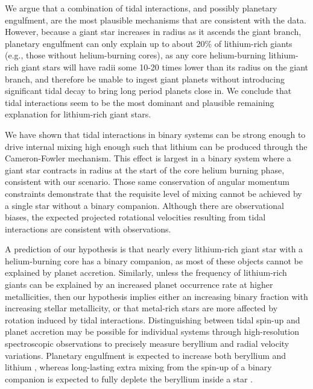 \documentclass[twocolumn]{aastex62}
\begin{document}
We argue that a combination of tidal interactions, and possibly planetary engulfment, 
are the most plausible mechanisms that are consistent with the data. However,
because a giant star increases in radius as it ascends the giant branch, 
planetary engulfment can only explain up to about 20\% of lithium-rich giants 
(e.g., those without helium-burning cores), as any core helium-burning lithium-rich
giant stars will have radii some 10-20 times lower than its radius on the giant branch, and therefore be unable to ingest giant planets without introducing significant tidal decay to bring long period planets close in.
We conclude that tidal interactions seem to be the most dominant and plausible
remaining explanation for lithium-rich giant stars.


We have shown that tidal interactions in binary systems can be strong enough
to drive internal mixing high enough such that lithium can be produced through the 
Cameron-Fowler mechanism. This effect is largest in a binary system where a giant star 
contracts in radius at the start of the core helium burning phase, consistent with
our scenario.
Those same conservation of angular momentum constraints demonstrate that the
requisite level of mixing cannot be achieved by a single star without a binary
companion. Although
there are observational biases, the expected projected rotational velocities 
resulting from tidal interactions are consistent with observations.

A prediction of our hypothesis is that nearly every lithium-rich giant star
with a helium-burning core has a binary companion, as most of these objects cannot be
explained by planet accretion. 
Similarly, unless 
the frequency of lithium-rich giants can be explained by an increased planet 
occurrence rate at higher metallicities,
then our hypothesis implies either an increasing binary fraction with increasing stellar 
metallicity, or that metal-rich stars are more affected by rotation induced by
tidal interactions.
Distinguishing between tidal spin-up and planet accretion may be possible for 
individual systems through high-resolution spectroscopic observations
to precisely measure beryllium and radial velocity variations. Planetary 
engulfment is expected to increase both beryllium and lithium \citep{Siess_1999,
Melo_2005}, whereas long-lasting extra mixing from the spin-up of a binary 
companion is expected to fully deplete the beryllium inside a star \citep{Sackmann_1999}.\\

\acknowledgments
\end{document}

